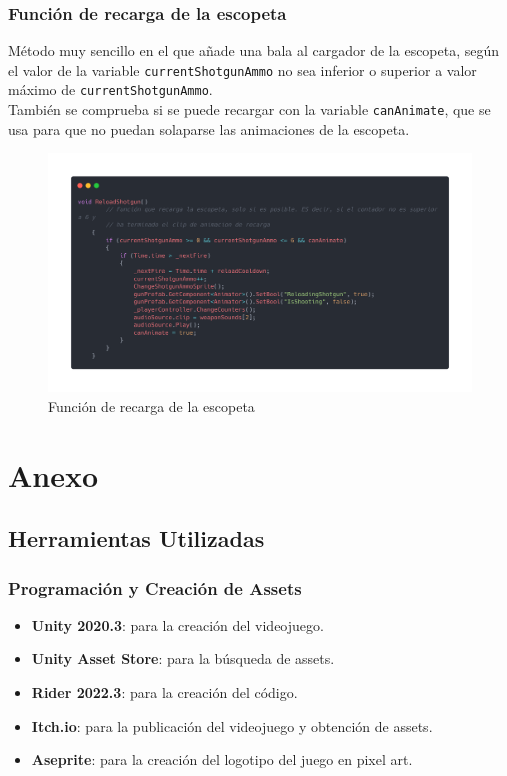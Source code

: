 \documentclass[12pt]{article}
\begin{document}
        \subsubsection{Función de recarga de la escopeta}  
            Método muy sencillo en el que añade una bala al cargador de la escopeta, según el valor de la variable \texttt{currentShotgunAmmo} no sea inferior o superior a valor máximo de \texttt{currentShotgunAmmo}.\\
            También se comprueba si se puede recargar con la variable \texttt{canAnimate}, que se usa para que no puedan solaparse las animaciones de la escopeta. 
            \begin{figure}[H]
                \centering
                \includegraphics[width=\textwidth]{Images/ShootyMacShooty/reload.png}
                \caption{Función de recarga de la escopeta}
            \end{figure}

\newpage
\section{Anexo}
    \subsection{Herramientas Utilizadas}
        \subsubsection{Programación y Creación de Assets}

            \begin{itemize}
                \item \textbf{Unity 2020.3}: \cite{Unity} para la creación del videojuego.
                \item \textbf{Unity Asset Store}: \cite{assetstore} para la búsqueda de assets.            
                \item \textbf{Rider 2022.3}: \cite{rider} para la creación del código.
                \item \textbf{Itch.io}: \cite{itch} para la publicación del videojuego y obtención de assets.
                \item \textbf{Aseprite}: \cite{aseprite} para la creación del logotipo del juego en pixel art.
            \end{itemize}
            
\end{document}
